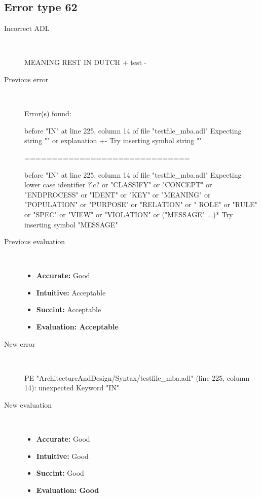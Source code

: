 \subsection{Error type 62}
  \begin{description}
  \item[Incorrect ADL]~\\
\begin{adl}
MEANING REST IN DUTCH  {+ test -}\end{adl}
  \item[Previous error]~\\
\begin{haskell}
Error(s) found:

before "IN" at line 225, column 14 of file "testfile_mba.adl"
Expecting string "" or explanation {+-}
Try inserting symbol string ""

==============================

before "IN" at line 225, column 14 of file "testfile_mba.adl"
Expecting lower case identifier ?lc? or "CLASSIFY" or "CONCEPT" or "ENDPROCESS"
or "IDENT" or "KEY" or "MEANING" or "POPULATION" or "PURPOSE" or "RELATION" or "
ROLE" or "RULE" or "SPEC" or "VIEW" or "VIOLATION" or ("MESSAGE" ...)*
Try inserting symbol "MESSAGE"\end{haskell}
  \item[Previous evaluation]~\\
    \begin{itemize}
    \item \textbf{Accurate:} Good
    \item \textbf{Intuitive:} Acceptable
    \item \textbf{Succint:} Acceptable
    \item \textbf{Evaluation: Acceptable}
    \end{itemize}
  \item[New error]~\\
\begin{haskell}
PE "ArchitectureAndDesign/Syntax/testfile_mba.adl" (line 225, column 14):
unexpected Keyword "IN"\end{haskell}
  \item[New evaluation]~\\
    \begin{itemize}
    \item \textbf{Accurate:} Good
    \item \textbf{Intuitive:} Good
    \item \textbf{Succint:} Good
    \item \textbf{Evaluation: Good
}
    \end{itemize}
  \end{description}

